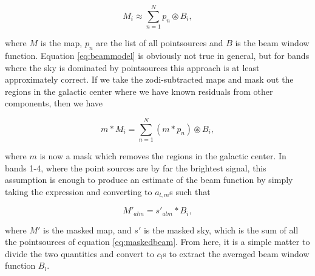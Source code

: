 \documentclass{aa}
\begin{document}
\begin{equation}
M_i \approx \sum_{n=1}^{N} p_n \circledast B_i,
\label{eq:beammodel}
\end{equation}

where $M$ is the map, $p_n$ are the list of all pointsources and $B$ is the beam window function. Equation \ref{eq:beammodel} is obviously not true in general, but for bands where the sky is dominated by pointsources this approach is at least approximately correct. If we take the zodi-subtracted maps and mask out the regions in the galactic center where we have known residuals from other components, then we have 

\begin{equation}
m * M_i = \sum_{n=1}^{N} (m*p_n) \circledast B_i,
\label{eq:maskedbeam}
\end{equation}

where $m$ is now a mask which removes the regions in the galactic center. In bands 1-4, where the point sources are by far the brightest signal, this assumption is enough to produce an estimate of the beam function by simply taking the expression and converting to $a_{l,m}$s such that

\begin{equation}
M'_{alm} = s'_{alm} * B_i,
\label{eq:maskedbeam}
\end{equation}

where $M'$ is the masked map, and $s'$ is the masked sky, which is the sum of all the pointsources of equation \ref{eq:maskedbeam}. From here, it is a simple matter to divide the two quantities and convert to $c_l$s to extract the averaged beam window function $B_l$.
\end{document}
